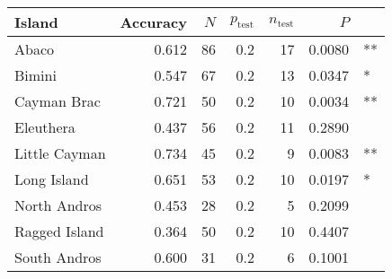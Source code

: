 
\begin{tabular}{lrrrrrl}
\toprule
Island & Accuracy & $N$ & $p_{\mbox{test}}$ & $n_{\mbox{test}}$ & $P$ & \\
\midrule
Abaco & 0.612 & 86 & 0.2 & 17 & 0.0080 & **\\
Bimini & 0.547 & 67 & 0.2 & 13 & 0.0347 & *\\
Cayman Brac & 0.721 & 50 & 0.2 & 10 & 0.0034 & **\\
Eleuthera & 0.437 & 56 & 0.2 & 11 & 0.2890 & \\
Little Cayman & 0.734 & 45 & 0.2 & 9 & 0.0083 & **\\
Long Island & 0.651 & 53 & 0.2 & 10 & 0.0197 & *\\
North Andros & 0.453 & 28 & 0.2 & 5 & 0.2099 & \\
Ragged Island & 0.364 & 50 & 0.2 & 10 & 0.4407 & \\
South Andros & 0.600 & 31 & 0.2 & 6 & 0.1001 & \\
\bottomrule
\end{tabular}
